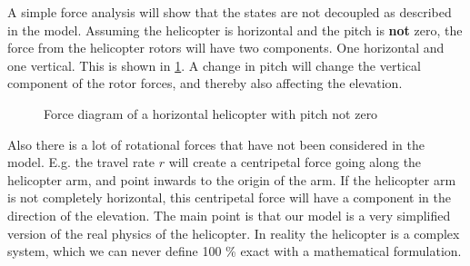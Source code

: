 \documentclass[../main.tex]{subfiles}
\begin{document}
A simple force analysis will show that the states are not decoupled as described in the model. Assuming the helicopter is horizontal and the pitch is \textbf{not} zero, the force from the helicopter rotors will have two components. One horizontal and one vertical. This is shown in \cref{fig:lab4_forces}. A change in pitch will change the vertical component of the rotor forces, and thereby also affecting the elevation.
\begin{figure}
	\centering
	\caption{Force diagram of a horizontal helicopter with pitch not zero} \label{fig:lab4_forces}
\end{figure}
Also there is a lot of rotational forces that have not been considered in the model. E.g. the travel rate $ r $ will create a centripetal force going along the helicopter arm, and point inwards to the origin of the arm. If the helicopter arm is not completely horizontal, this centripetal force will have a component in the direction of the elevation. The main point is that our model is a very simplified version of the real physics of the helicopter. In reality the helicopter is a complex system, which we can never define 100 \% exact with a mathematical formulation.
\end{document}

